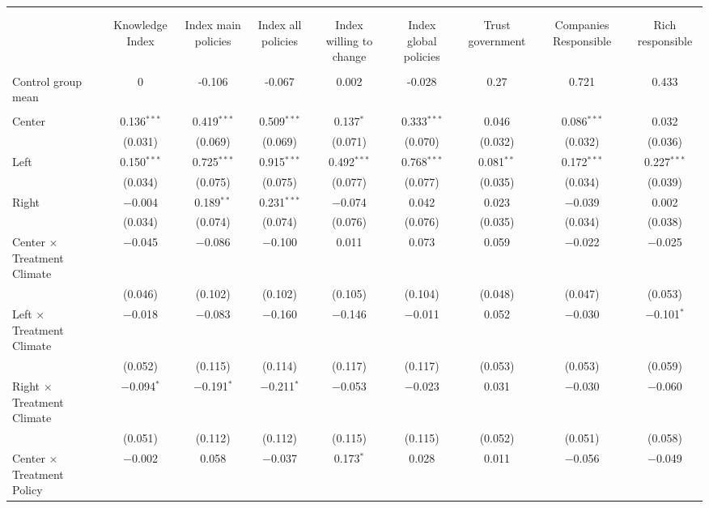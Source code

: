 
\begin{tabular}{@{\extracolsep{5pt}}lcccccccc} 
\\[-1.8ex]\hline 
\hline \\[-1.8ex] 
\\[-1.8ex] & Knowledge Index & Index main policies & Index all policies & Index willing to change & Index global policies & Trust government & Companies Responsible & Rich responsible \\ 
\hline \\[-1.8ex] 
 Control group mean & 0 & -0.106 & -0.067 & 0.002 & -0.028 & 0.27 & 0.721 & 0.433  \\ \hline \\[-1.8ex] Center & 0.136$^{***}$ & 0.419$^{***}$ & 0.509$^{***}$ & 0.137$^{*}$ & 0.333$^{***}$ & 0.046 & 0.086$^{***}$ & 0.032 \\ 
  & (0.031) & (0.069) & (0.069) & (0.071) & (0.070) & (0.032) & (0.032) & (0.036) \\ 
 Left & 0.150$^{***}$ & 0.725$^{***}$ & 0.915$^{***}$ & 0.492$^{***}$ & 0.768$^{***}$ & 0.081$^{**}$ & 0.172$^{***}$ & 0.227$^{***}$ \\ 
  & (0.034) & (0.075) & (0.075) & (0.077) & (0.077) & (0.035) & (0.034) & (0.039) \\ 
 Right & $-$0.004 & 0.189$^{**}$ & 0.231$^{***}$ & $-$0.074 & 0.042 & 0.023 & $-$0.039 & 0.002 \\ 
  & (0.034) & (0.074) & (0.074) & (0.076) & (0.076) & (0.035) & (0.034) & (0.038) \\ 
 Center $\times$ Treatment Climate & $-$0.045 & $-$0.086 & $-$0.100 & 0.011 & 0.073 & 0.059 & $-$0.022 & $-$0.025 \\ 
  & (0.046) & (0.102) & (0.102) & (0.105) & (0.104) & (0.048) & (0.047) & (0.053) \\ 
 Left $\times$ Treatment Climate & $-$0.018 & $-$0.083 & $-$0.160 & $-$0.146 & $-$0.011 & 0.052 & $-$0.030 & $-$0.101$^{*}$ \\ 
  & (0.052) & (0.115) & (0.114) & (0.117) & (0.117) & (0.053) & (0.053) & (0.059) \\ 
 Right $\times$ Treatment Climate & $-$0.094$^{*}$ & $-$0.191$^{*}$ & $-$0.211$^{*}$ & $-$0.053 & $-$0.023 & 0.031 & $-$0.030 & $-$0.060 \\ 
  & (0.051) & (0.112) & (0.112) & (0.115) & (0.115) & (0.052) & (0.051) & (0.058) \\ 
 Center $\times$ Treatment Policy & $-$0.002 & 0.058 & $-$0.037 & 0.173$^{*}$ & 0.028 & 0.011 & $-$0.056 & $-$0.049 \\ 

\end{tabular}
